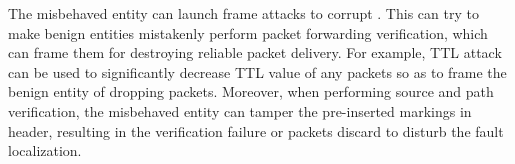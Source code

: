  The misbehaved entity can launch frame attacks to corrupt \name{}. This can try to make benign entities mistakenly perform packet forwarding verification, which can frame them for destroying reliable packet delivery. For example, TTL attack can be used to significantly decrease TTL value of any packets so as to frame the benign entity of dropping packets. Moreover, when performing source and path verification, the misbehaved entity can tamper the pre-inserted markings in \name{} header, resulting in the verification failure or packets discard to disturb the fault localization.
